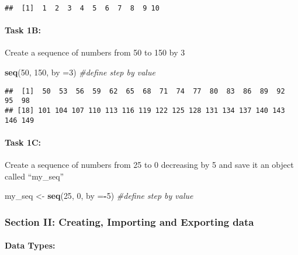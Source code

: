 \documentclass[]{article}
\newenvironment{Shaded}{\begin{snugshade}}{\end{snugshade}}
\newcommand{\KeywordTok}[1]{\textcolor[rgb]{0.13,0.29,0.53}{\textbf{#1}}}
\newcommand{\DataTypeTok}[1]{\textcolor[rgb]{0.13,0.29,0.53}{#1}}
\newcommand{\DecValTok}[1]{\textcolor[rgb]{0.00,0.00,0.81}{#1}}
\newcommand{\StringTok}[1]{\textcolor[rgb]{0.31,0.60,0.02}{#1}}
\newcommand{\CommentTok}[1]{\textcolor[rgb]{0.56,0.35,0.01}{\textit{#1}}}
\newcommand{\OperatorTok}[1]{\textcolor[rgb]{0.81,0.36,0.00}{\textbf{#1}}}
\newcommand{\NormalTok}[1]{#1}
\let\oldparagraph\paragraph
\renewcommand{\paragraph}[1]{\oldparagraph{#1}\mbox{}}
\begin{document}
\begin{verbatim}
##  [1]  1  2  3  4  5  6  7  8  9 10
\end{verbatim}

\paragraph{Task 1B:}\label{task-1b}

Create a sequence of numbers from 50 to 150 by 3

\begin{Shaded}
\begin{Highlighting}[]
\KeywordTok{seq}\NormalTok{(}\DecValTok{50}\NormalTok{, }\DecValTok{150}\NormalTok{, }\DataTypeTok{by =}\DecValTok{3}\NormalTok{) }\CommentTok{#define step by value}
\end{Highlighting}
\end{Shaded}

\begin{verbatim}
##  [1]  50  53  56  59  62  65  68  71  74  77  80  83  86  89  92  95  98
## [18] 101 104 107 110 113 116 119 122 125 128 131 134 137 140 143 146 149
\end{verbatim}

\paragraph{Task 1C:}\label{task-1c}

Create a sequence of numbers from 25 to 0 decreasing by 5 and save it an
object called ``my\_seq''

\begin{Shaded}
\begin{Highlighting}[]
\NormalTok{my_seq <-}\StringTok{ }\KeywordTok{seq}\NormalTok{(}\DecValTok{25}\NormalTok{, }\DecValTok{0}\NormalTok{, }\DataTypeTok{by =}\OperatorTok{-}\DecValTok{5}\NormalTok{) }\CommentTok{#define step by value}
\end{Highlighting}
\end{Shaded}

\subsubsection{Section II: Creating, Importing and Exporting
data}\label{section-ii-creating-importing-and-exporting-data}

\paragraph{Data Types:}\label{data-types}
\end{document}
